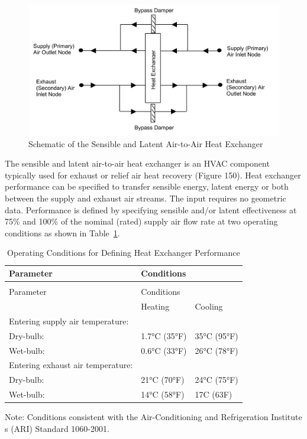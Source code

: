 \begin{figure}[htbp]
\centering
\includegraphics{media/image423.png}
\caption{Schematic of the Sensible and Latent Air-to-Air Heat Exchanger}
\end{figure}

The sensible and latent air-to-air heat exchanger is an HVAC component typically used for exhaust or relief air heat recovery (Figure 150). Heat exchanger performance can be specified to transfer sensible energy, latent energy or both between the supply and exhaust air streams. The input requires no geometric data. Performance is defined by specifying sensible and/or latent effectiveness at 75\% and 100\% of the nominal (rated) supply air flow rate at two operating conditions as shown in Table~\ref{table:operating-conditions-for-defining-heat}.

\begin{longtable}[c]{@{}lll@{}}
\caption{Operating Conditions for Defining Heat Exchanger Performance \label{table:operating-conditions-for-defining-heat}} \tabularnewline
\toprule
Parameter & Conditions & \tabularnewline
\midrule
\endfirsthead

\caption[]{Operating Conditions for Defining Heat Exchanger Performance} \tabularnewline
\toprule
Parameter & Conditions & \tabularnewline
\midrule
\endhead

& Heating & Cooling \tabularnewline
Entering supply air temperature: &  &  \tabularnewline
Dry-bulb: & 1.7°C (35°F) & 35°C (95°F) \tabularnewline
Wet-bulb: & 0.6°C (33°F) & 26°C (78°F) \tabularnewline
Entering exhaust air temperature: &  &  \tabularnewline
Dry-bulb: & 21°C (70°F) & 24°C (75°F) \tabularnewline
Wet-bulb: & 14°C (58°F) & 17C (63F) \tabularnewline
\bottomrule
\end{longtable}

Note: Conditions consistent with the Air-Conditioning and Refrigeration Institute s (ARI) Standard 1060-2001.

